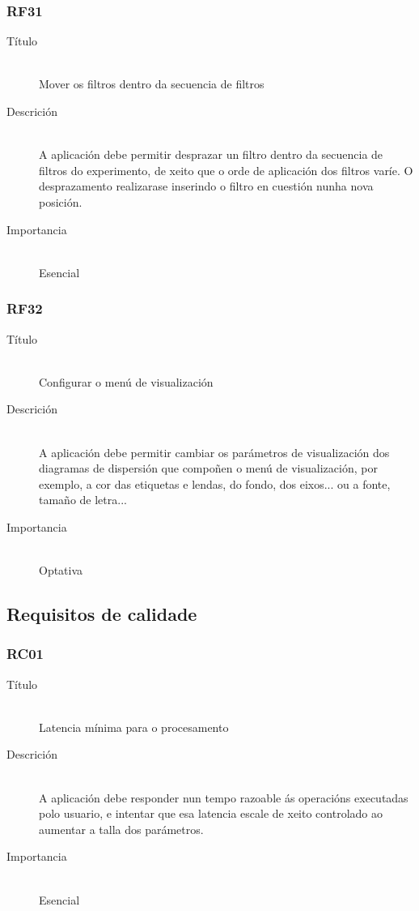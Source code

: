 \subsubsection*{RF31}
\begin{description}
\item[Título] \hfill \\
Mover os filtros dentro da secuencia de filtros
\item[Descrición] \hfill \\
A aplicación debe permitir desprazar un filtro dentro da secuencia de filtros do experimento, de xeito que o orde de aplicación dos filtros varíe. O desprazamento realizarase inserindo o filtro en cuestión nunha nova posición.
\item[Importancia] \hfill \\
Esencial
\end{description}

\subsubsection*{RF32}
\begin{description}
\item[Título] \hfill \\
Configurar o menú de visualización
\item[Descrición] \hfill \\
A aplicación debe permitir cambiar os parámetros de visualización dos diagramas de dispersión que compoñen o menú de visualización, por exemplo, a cor das etiquetas e lendas, do fondo, dos eixos... ou a fonte, tamaño de letra...
\item[Importancia] \hfill \\
Optativa
\end{description}

\subsection{Requisitos de calidade}

\subsubsection*{RC01}
\begin{description}
\item[Título] \hfill \\
Latencia mínima para o procesamento
\item[Descrición] \hfill \\
A aplicación debe responder nun tempo razoable ás operacións executadas polo usuario, e intentar que esa latencia escale de xeito controlado ao aumentar a talla dos parámetros.
\item[Importancia] \hfill \\
Esencial
\end{description}

